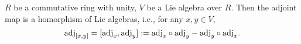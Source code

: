 \begin{proposition}
  $R$ be a commutative ring with unity, $V$ be a Lie algebra over $R$.
  Then the adjoint map is a homorphism of Lie algebras, i.e.,
  for any $x, y \in V$,
  \begin{equation}
    {\rm adj}_{[x, y]}
    = [{\rm adj}_x, {\rm adj}_y]
    := {\rm adj}_x \circ {\rm adj}_y - {\rm adj}_y \circ {\rm adj}_x.
  \end{equation}
\end{proposition}
